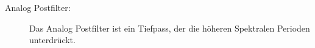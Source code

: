 \begin{description}
		\item[Analog Postfilter:] Das Analog Postfilter ist ein Tiefpass, der die höheren Spektralen Perioden unterdrückt.
		
	\end{description}
	

		
		
